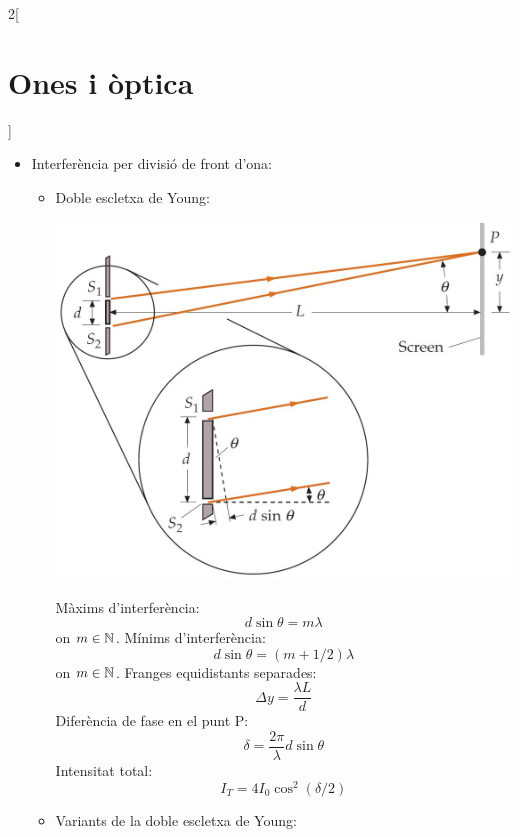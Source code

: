 \documentclass[../../../main.tex]{subfiles}
\begin{document}
\begin{multicols}{2}[\section{Ones i òptica}]
\begin{itemize}
\begin{itemize}
\begin{itemize}
\begin{minipage}{\linewidth}
                          \end{minipage}
                  \end{itemize}
          \end{itemize}
    \item Interferència per divisió de front d'ona:
          \begin{itemize}
            \item Doble escletxa de Young:\newline
                  \begin{minipage}{\linewidth}
                    \includegraphics[width=\linewidth]{Physics/1st/Waves_and_optics/Images/young.jpg}
                  \end{minipage}
                  Màxims d'interferència: $$d\sin\theta=m\lambda$${\footnotesize on $m\in\mathbb{N}$.}\newline
                  Mínims d'interferència: $$d\sin\theta=(m+1/2)\lambda$$ {\footnotesize on $m\in\mathbb{N}$.}\newline
                  Franges equidistants separades: $$\Delta y=\frac{\lambda L}{d}$$
                  Diferència de fase en el punt P:
                  $$\delta=\frac{2\pi}{\lambda}d\sin\theta$$
                  Intensitat total: $$I_T=4I_0\cos^2(\delta/2)$$
            \item Variants de la doble escletxa de Young:
                  \begin{itemize}

\end{itemize}
\end{itemize}
\end{itemize}
\end{multicols}
\end{document}
